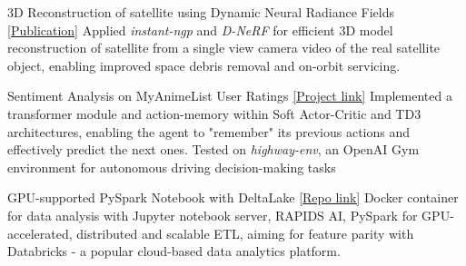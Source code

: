 \vspace{-5mm}
\vspace{-2mm}

\begin{cventries}

	\cventry
	{}
	{3D Reconstruction of satellite using Dynamic Neural Radiance Fields}
	{\href{https://arxiv.org/abs/2301.09060}{[Publication]}}
	{}
	{Applied \emph{instant-ngp} and \emph{D-NeRF} for efficient 3D model reconstruction of satellite from a single view camera video of the real satellite object, enabling improved space debris removal and on-orbit servicing.}

	\cventry
	{}
	{Sentiment Analysis on MyAnimeList User Ratings}
	{\href{https://github.com/n0k0m3/rnn-mal-sentiment}{[Project link]}}
	{}
	{Implemented a transformer module and action-memory within Soft Actor-Critic and TD3 architectures, enabling the agent to "remember" its previous actions and effectively predict the next ones. Tested on \emph{highway-env}, an OpenAI Gym environment for autonomous driving decision-making tasks}

	\cventry
	{}
	{GPU-supported PySpark Notebook with DeltaLake}
	{\href{https://github.com/n0k0m3/pyspark-notebook-deltalake-docker}{[Repo link]}}
	{}
	{Docker container for data analysis with Jupyter notebook server, RAPIDS AI, PySpark for GPU-accelerated, distributed and scalable ETL, aiming for feature parity with Databricks - a popular cloud-based data analytics platform.}





\end{cventries}
